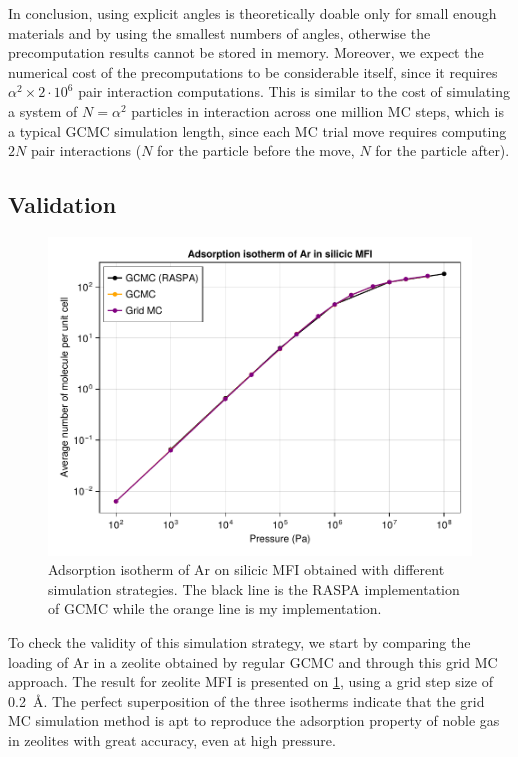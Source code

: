 \documentclass[main.tex]{subfiles}
\begin{document}
In conclusion, using explicit angles is theoretically doable only for small enough materials and by using the smallest numbers of angles, otherwise the precomputation results cannot be stored in memory. Moreover, we expect the numerical cost of the precomputations to be considerable itself, since it requires $\alpha^2\times 2\cdot10^6$ pair interaction computations. This is similar to the cost of simulating a system of $N = \alpha^2$ particles in interaction across one million MC steps, which is a typical GCMC simulation length, since each MC trial move requires computing $2N$ pair interactions ($N$ for the particle before the move, $N$ for the particle after).

\subsection{Validation}

\begin{figure}
	\centering
	\includegraphics[width=0.8\columnwidth]{figures/gcmc/gridmc_Ar_MFI.pdf}
	\caption{Adsorption isotherm of Ar on silicic MFI obtained with different simulation strategies. The black line is the RASPA implementation of GCMC while the orange line is my implementation.}\label{fig:gridMC-ArMFI}
\end{figure}

To check the validity of this simulation strategy, we start by comparing the loading of Ar in a zeolite obtained by regular GCMC and through this grid MC approach. The result for zeolite MFI is presented on \cref{fig:gridMC-ArMFI}, using a grid step size of \qty{0.2}{\angstrom}. The perfect superposition of the three isotherms indicate that the grid MC simulation method is apt to reproduce the adsorption property of noble gas in zeolites with great accuracy, even at high pressure.
\end{document}
